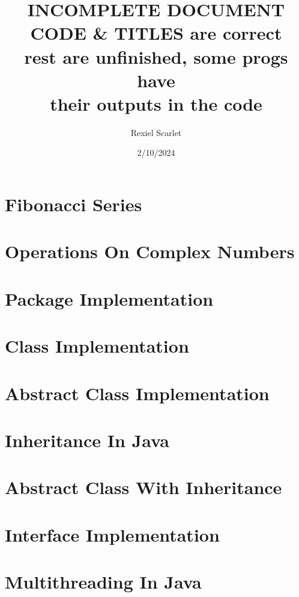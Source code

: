 \documentclass{article}
\title{%
  INCOMPLETE DOCUMENT \\
  \large CODE \& TITLES are correct \\ 
  rest are unfinished, some progs have \\
  their outputs in the code\\
}
\author{Rexiel Scarlet}
\date{2/10/2024}
\begin{document}
\maketitle
\newpage

\tableofcontents
\newpage

\section{Fibonacci Series}

\newpage

\section{Operations On Complex Numbers}

\newpage

\section{Package Implementation}
\newpage

\section{Class Implementation}

\newpage

\section{Abstract Class Implementation}

\newpage

\section{Inheritance In Java}

\newpage

\section{Abstract Class With Inheritance}

\newpage

\section{Interface Implementation}

\newpage

\section{Multithreading In Java}

\newpage
\end{document}

